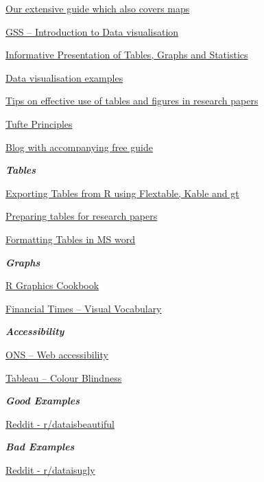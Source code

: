 \documentclass[
]{book}
\begin{document}
\href{}{Our extensive guide which also covers maps}

\href{https://gss.civilservice.gov.uk/policy-store/introduction-to-data-visualisation/\#section-7}{GSS -- Introduction to Data visualisation}

\href{https://stats4sd.org/resources/412}{Informative Presentation of Tables, Graphs and Statistics}

\href{https://stats4sd.org/resources/59}{Data visualisation examples}

\href{https://www.editage.com/insights/tips-on-effective-use-of-tables-and-figures-in-research-papers}{Tips on effective use of tables and figures in research papers}

\href{https://sites.google.com/site/tufteondesign/home/six-fundamental-principles-of-design}{Tufte Principles}

\href{https://blog.hubspot.com/marketing/great-data-visualization-examples}{Blog with accompanying free guide}

\textbf{\emph{Tables}}

\href{https://stats4sd.org/resources/506}{Exporting Tables from R using Flextable, Kable and gt}

\href{https://www.manuscriptedit.com/scholar-hangout/preparing-tables-research-papers/}{Preparing tables for research papers}

\href{http://www.docs.is.ed.ac.uk/skills/documents/3575/3575.pdf}{Formatting Tables in MS word}

\textbf{\emph{Graphs}}

\href{https://r-graphics.org/}{R Graphics Cookbook}

\href{https://github.com/ft-interactive/chart-doctor/blob/master/visual-vocabulary/Visual-vocabulary.pdf}{Financial Times -- Visual Vocabulary}

\textbf{\emph{Accessibility}}

\href{https://style.ons.gov.uk/writing-for-the-web/web-accessibility/introduction-3/}{ONS -- Web accessibility}

\href{https://www.tableau.com/about/blog/2016/4/examining-data-viz-rules-dont-use-red-green-together-53463}{Tableau -- Colour Blindness}

\textbf{\emph{Good Examples}}

\href{https://www.reddit.com/r/dataisbeautiful/}{Reddit - r/dataisbeautiful}

\textbf{\emph{Bad Examples}}

\href{https://www.reddit.com/r/dataisugly/}{Reddit - r/dataisugly}
\end{document}
